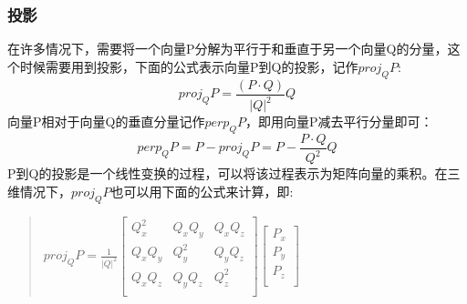 \documentclass[a4paper,10pt]{article}
\begin{document}
\begin{CJK}{UTF8}{song}
\subsubsection{投影}
在许多情况下，需要将一个向量P分解为平行于和垂直于另一个向量Q的分量，这个时候需要用到投影，下面的公式表示向量P到Q的投影，记作$proj_{Q}P$:
\begin{displaymath}
proj_{Q}P=\frac{(P\cdot{}Q)}{|Q|^2}Q
\end{displaymath}
向量P相对于向量Q的垂直分量记作$perp_{Q}P$，即用向量P减去平行分量即可：
\begin{displaymath}
perp_{Q}P=P-proj_{Q}P=P-\frac{P\cdot{}Q}{Q^2}Q
\end{displaymath}
P到Q的投影是一个线性变换的过程，可以将该过程表示为矩阵向量的乘积。在三维情况下，$proj_{Q}P$也可以用下面的公式来计算，即:
\begin{quote}
$proj_{Q}P=\frac{1}{|Q|^2}\left[
\begin{array}{ccc}
Q_{x}^2 &Q_{x}Q_{y} & Q_{x}Q_{z} \\
Q_{x}Q_{y} & Q_{y}^2 & Q_{y}Q_{z} \\
Q_{x}Q_{z} & Q_{y}Q_{z} & Q_{z}^2 \\
\end{array} \right]
\left[
\begin{array}{c}
P_{x} \\
P_{y} \\
P_{z} \\
\end{array}
\right]
$
\end{quote}




\end{CJK}
\end{document}
